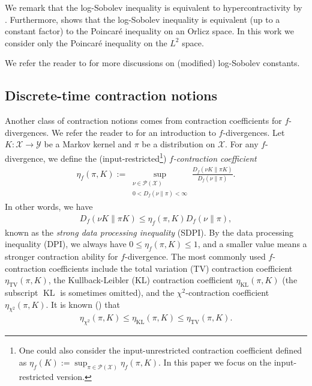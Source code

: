 \documentclass[11pt]{article}
\def\cP{\mathcal{P}}
\def\cX{\mathcal{X}}
\def\cY{\mathcal{Y}}
\DeclareMathOperator\KL{\mathrm{KL}}
\DeclareMathOperator\TV{\mathrm{TV}}
\newcommand{\zongchen}[1]{{\color{teal}[Zongchen: #1]}}
\theoremstyle{definition}
\begin{document}
We remark that the log-Sobolev inequality is equivalent to hypercontractivity by \cite{diaconis1996logarithmic}.
Furthermore, \cite{bobkov1999exponential} shows that the log-Sobolev inequality is equivalent (up to a constant factor) to the Poincar\'e inequality on an Orlicz space. In this work we consider only the Poincar\'e inequality on the $L^2$ space.

We refer the reader to \cite{diaconis1996logarithmic,bobkov2006modified} for more discussions on (modified) log-Sobolev constants.

\subsection{Discrete-time contraction notions} \label{sec:intro:discrete}
Another class of contraction notions comes from contraction coefficients for $f$-divergences. We refer the reader to \cite[Chapter 7]{polyanskiy2024information} for an introduction to $f$-divergences.
Let $K: \cX \to \cY$ be a Markov kernel and $\pi$ be a distribution on $\cX$.
For any $f$-divergence, we define the (input-restricted\footnote{One could also consider the input-unrestricted contraction coefficient defined as $\eta_f(K) := \sup_{\pi\in \cP(\cX)} \eta_f(\pi, K)$. In this paper we focus on the input-restricted version.}) \emph{$f$-contraction coefficient} %
\begin{align} \label{eqn:f-contraction-coef}
  \eta_f(\pi, K) := \sup_{\substack{\nu\in \cP(\cX) \\ 0<D_f(\nu\|\pi)<\infty}} \frac{D_f(\nu K \| \pi K)}{D_f(\nu \| \pi)}.
\end{align}
In other words, we have
\begin{align}
  D_f(\nu K \| \pi K) \le \eta_f(\pi, K) D_f(\nu \| \pi),
\end{align}
known as the \emph{strong data processing inequality} (SDPI).
By the data processing inequality (DPI), we always have $0\le \eta_f(\pi, K) \le 1$, and a smaller value means a stronger contraction ability for $f$-divergence.
The most commonly used $f$-contraction coefficients include the total variation (TV) contraction coefficient $\eta_{\TV}(\pi, K)$, the Kullback-Leibler (KL) contraction coefficient $\eta_{\KL}(\pi, K)$ (the subscript $\KL$ is sometimes omitted), and the $\chi^2$-contraction coefficient $\eta_{\chi^2}(\pi, K)$.
It is known (\cite{ahlswede1976spreading,polyanskiy2017strong}) that
\begin{align} \label{eqn:eta-chi2-kl-tv-comparison}
  \eta_{\chi^2}(\pi, K) \le \eta_{\KL}(\pi, K) \le \eta_{\TV}(\pi, K).
\end{align}
\end{document}
